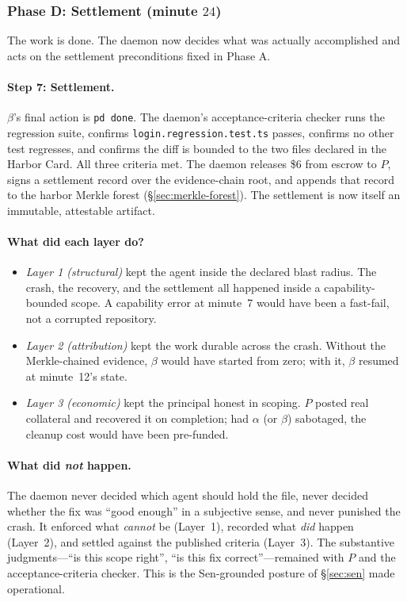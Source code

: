 \documentclass[11pt,a4paper]{article}
\theoremstyle{definition}
\theoremstyle{remark}
\begin{document}
\subsubsection*{Phase D: Settlement (minute $24$)}

The work is done. The daemon now decides what was actually accomplished and acts on the settlement preconditions fixed in Phase A.

\paragraph{Step 7: Settlement.} $\beta$'s final action is \texttt{pd done}. The daemon's acceptance-criteria checker runs the regression suite, confirms \texttt{login.regression.test.ts} passes, confirms no other test regresses, and confirms the diff is bounded to the two files declared in the Harbor Card. All three criteria met. The daemon releases \$6 from escrow to $P$, signs a settlement record over the evidence-chain root, and appends that record to the harbor Merkle forest (\S\ref{sec:merkle-forest}). The settlement is now itself an immutable, attestable artifact.

\paragraph{What did each layer do?}
\begin{itemize}[nosep]
  \item \emph{Layer 1 (structural)} kept the agent inside the declared blast radius. The crash, the recovery, and the settlement all happened inside a capability-bounded scope. A capability error at minute~7 would have been a fast-fail, not a corrupted repository.
  \item \emph{Layer 2 (attribution)} kept the work durable across the crash. Without the Merkle-chained evidence, $\beta$ would have started from zero; with it, $\beta$ resumed at minute~12's state.
  \item \emph{Layer 3 (economic)} kept the principal honest in scoping. $P$ posted real collateral and recovered it on completion; had $\alpha$ (or $\beta$) sabotaged, the cleanup cost would have been pre-funded.
\end{itemize}

\paragraph{What did \emph{not} happen.} The daemon never decided which agent should hold the file, never decided whether the fix was ``good enough'' in a subjective sense, and never punished the crash. It enforced what \emph{cannot} be (Layer~1), recorded what \emph{did} happen (Layer~2), and settled against the published criteria (Layer~3). The substantive judgments---``is this scope right'', ``is this fix correct''---remained with $P$ and the acceptance-criteria checker. This is the Sen-grounded posture of \S\ref{sec:sen} made operational.
\end{document}
